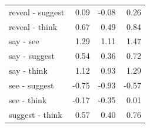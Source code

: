\begin{longtable}{lrrr}
  reveal - suggest & 0.09 & -0.08 & 0.26 \\ 
  reveal - think & 0.67 & 0.49 & 0.84 \\ 
  say - see & 1.29 & 1.11 & 1.47 \\ 
  say - suggest & 0.54 & 0.36 & 0.72 \\ 
  say - think & 1.12 & 0.93 & 1.29 \\ 
  see - suggest & -0.75 & -0.93 & -0.57 \\ 
  see - think & -0.17 & -0.35 & 0.01 \\ 
  suggest - think & 0.57 & 0.40 & 0.76 \\ 
  \end{longtable}

